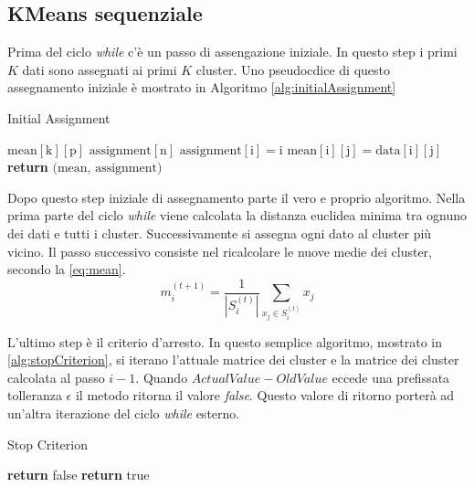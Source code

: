 \documentclass[10pt,twocolumn,letterpaper]{article}
\begin{document}
\subsection{KMeans sequenziale}

Prima del ciclo \textit{while} c'è un passo di assengazione iniziale. In questo step i primi $K$ dati sono assegnati ai primi $K$ cluster. Uno pseudocdice di questo assegnamento iniziale è mostrato in Algoritmo \ref{alg:initialAssignment}
\begin{algorithm}
\caption{Initial Assignment}
\label{alg:initialAssignment}
\begin{algorithmic}[1]
\State $\text{mean}[\text{k}][\text{p}]$
\State $\text{assignment}[\text{n}]$
\State $\text{assignment}[\text{i}] = \text{i}$
\State $\text{mean}[\text{i}][\text{j}] = \text{data}[\text{i}][\text{j}]$
\EndFor
\EndFor
\State \textbf{return} $\text{(mean, assignment)}$
\EndProcedure
\end{algorithmic}
\end{algorithm}

Dopo questo step iniziale di assegnamento parte il vero e proprio algoritmo. Nella prima parte del ciclo \textit{while} viene calcolata la distanza euclidea minima tra ognuno dei dati e tutti i cluster. Successivamente si assegna ogni dato al cluster più vicino.
Il passo successivo consiste nel ricalcolare le nuove medie dei cluster, secondo la \eqref{eq:mean}. 
\begin{equation}
\label{eq:mean}
m_i^{(t+1)} = \frac{1}{|S^{(t)}_i|} \displaystyle\sum_{x_{j} \in S^{(t)}_i} x_j 
\end{equation}


L'ultimo step è il criterio d'arresto. In questo semplice algoritmo, mostrato in \ref{alg:stopCriterion}, si iterano l'attuale matrice dei cluster e la matrice dei cluster calcolata al passo $i-1$. Quando $ActualValue - OldValue$ eccede una prefissata tolleranza $\epsilon$ il metodo ritorna il valore \textit{false}. Questo valore di ritorno porterà ad un'altra iterazione del ciclo \textit{while} esterno.

\begin{algorithm}
\caption{Stop Criterion}
\label{alg:stopCriterion}
\begin{algorithmic}[1]
\State \textbf{return} false
\EndIf
\EndFor
\State \textbf{return} true
\EndProcedure
\end{algorithmic}
\end{algorithm}
\end{document}
